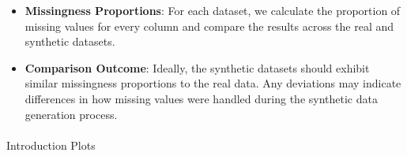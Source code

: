 \documentclass[
  letterpaper,
  DIV=11,
  numbers=noendperiod]{scrartcl}
\makeatletter
\let\oldparagraph\paragraph
\renewcommand{\paragraph}{
    \@ifstar
      \xxxParagraphStar
      \xxxParagraphNoStar
  }
\newcommand{\xxxParagraphStar}[1]{\oldparagraph*{#1}\mbox{}}
\newcommand{\xxxParagraphNoStar}[1]{\oldparagraph{#1}\mbox{}}
\makeatother
\begin{document}
\begin{itemize}
\item
  \textbf{Missingness Proportions}: For each dataset, we calculate the
  proportion of missing values for every column and compare the results
  across the real and synthetic datasets.
\item
  \textbf{Comparison Outcome}: Ideally, the synthetic datasets should
  exhibit similar missingness proportions to the real data. Any
  deviations may indicate differences in how missing values were handled
  during the synthetic data generation process.
\end{itemize}

\paragraph{Introduction Plots}\label{introduction-plots}
\end{document}
